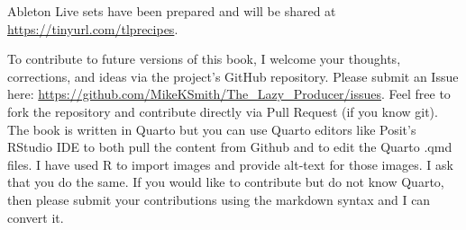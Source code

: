 \documentclass[
  12pt,
  letterpaper,
  oneside,
  open=any]{scrbook}
\begin{document}
Ableton Live sets have been prepared and will be shared at
\url{https://tinyurl.com/tlprecipes}.

To contribute to future versions of this book, I welcome your thoughts,
corrections, and ideas via the project's GitHub repository. Please
submit an Issue here:
\url{https://github.com/MikeKSmith/The_Lazy_Producer/issues}. Feel free
to fork the repository and contribute directly via Pull Request (if you
know git). The book is written in Quarto but you can use Quarto editors
like Posit's RStudio IDE to both pull the content from Github and to
edit the Quarto .qmd files. I have used R to import images and provide
alt-text for those images. I ask that you do the same. If you would like
to contribute but do not know Quarto, then please submit your
contributions using the markdown syntax and I can convert it.


\backmatter
\end{document}
